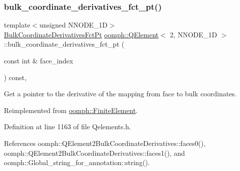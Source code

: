 \subsubsection{\texorpdfstring{bulk\+\_\+coordinate\+\_\+derivatives\+\_\+fct\+\_\+pt()}{bulk\_coordinate\_derivatives\_fct\_pt()}}
{\footnotesize\ttfamily template$<$unsigned N\+N\+O\+D\+E\+\_\+1D$>$ \\
\hyperlink{namespaceoomph_a0a75fbfa1139f00cf88adeee835c8fe5}{Bulk\+Coordinate\+Derivatives\+Fct\+Pt} \hyperlink{classoomph_1_1QElement}{oomph\+::\+Q\+Element}$<$ 2, N\+N\+O\+D\+E\+\_\+1D $>$\+::bulk\+\_\+coordinate\+\_\+derivatives\+\_\+fct\+\_\+pt (\begin{DoxyParamCaption}\item[{const int \&}]{face\+\_\+index }\end{DoxyParamCaption}) const\hspace{0.3cm}{\ttfamily [inline]}, {\ttfamily [virtual]}}

Get a pointer to the derivative of the mapping from face to bulk coordinates. 

Reimplemented from \hyperlink{classoomph_1_1FiniteElement_a8b29bbf8e20cf2ccf91674ca09ed80aa}{oomph\+::\+Finite\+Element}.



Definition at line 1163 of file Qelements.\+h.



References oomph\+::\+Q\+Element2\+Bulk\+Coordinate\+Derivatives\+::faces0(), oomph\+::\+Q\+Element2\+Bulk\+Coordinate\+Derivatives\+::faces1(), and oomph\+::\+Global\+\_\+string\+\_\+for\+\_\+annotation\+::string().

\mbox{\label{classoomph_1_1QElement_3_012_00_01NNODE__1D_01_4_a396c7d1cd525dd1a8401e49635eeaf43}} 
